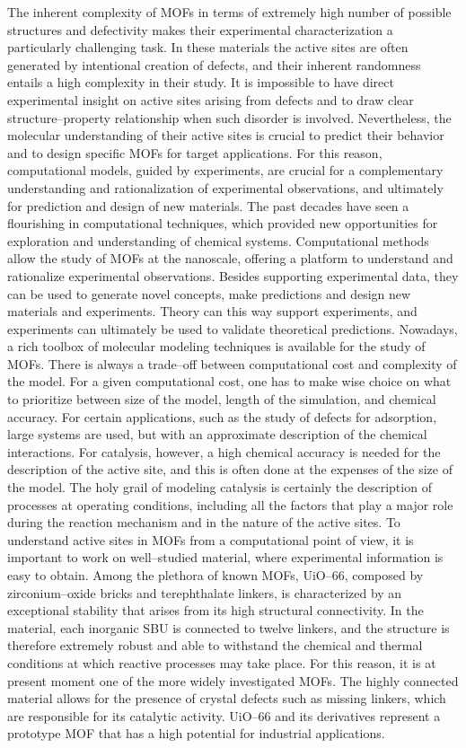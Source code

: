 \npar
The inherent complexity of MOFs in terms of extremely high number of possible structures and defectivity makes their experimental characterization a particularly challenging task. In these materials the active sites are often generated by intentional creation of defects, and their inherent randomness entails a high complexity in their study. It is impossible to have direct experimental insight on active sites arising from defects and to draw clear structure--property relationship when such disorder is involved. Nevertheless, the molecular understanding of their active sites is crucial to predict their behavior and to design specific MOFs for target applications. For this reason, computational models, guided by experiments, are crucial for a complementary understanding and rationalization of experimental observations, and ultimately for prediction and design of new materials. The past decades have seen a flourishing in computational techniques, which provided new opportunities for exploration and understanding of chemical systems. Computational methods allow the study of MOFs at the nanoscale, offering a platform to understand and rationalize experimental observations. Besides supporting experimental data, they can be used to generate novel concepts, make predictions and design new materials and experiments. Theory can this way support experiments, and experiments can ultimately be used to validate theoretical predictions. 
\npar
Nowadays, a rich toolbox of molecular modeling techniques is available for the study of MOFs. There is always a trade--off between computational cost and complexity of the model. For a given computational cost, one has to make wise choice on what to prioritize between size of the model, length of the simulation, and chemical accuracy. For certain applications, such as the study of defects for adsorption, large systems are used, but with an approximate description of the chemical interactions. For catalysis, however, a high chemical accuracy is needed for the description of the active site, and this is often done at the expenses of the size of the model. The holy grail of modeling catalysis is certainly the description of processes at operating conditions, including all the factors that play a major role during the reaction mechanism and in the nature of the active sites. 
\npar
To understand active sites in MOFs from a computational point of view, it is important to work on well--studied material, where experimental information is easy to obtain. Among the plethora of known MOFs, UiO--66, composed by zirconium--oxide bricks and terephthalate linkers, is characterized by an exceptional stability that arises from its high structural connectivity. In the material, each inorganic SBU is connected to twelve linkers, and the structure is therefore extremely robust and able to withstand the chemical and thermal conditions at which reactive processes may take place. For this reason, it is at present moment one of the more widely investigated MOFs. The highly connected material allows for the presence of crystal defects such as missing linkers, which are responsible for its catalytic activity. UiO--66 and its derivatives represent a prototype MOF that has a high potential for industrial applications. 
